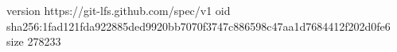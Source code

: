 version https://git-lfs.github.com/spec/v1
oid sha256:1fad121fda922885ded9920bb7070f3747c886598c47aa1d7684412f202d0fe6
size 278233
